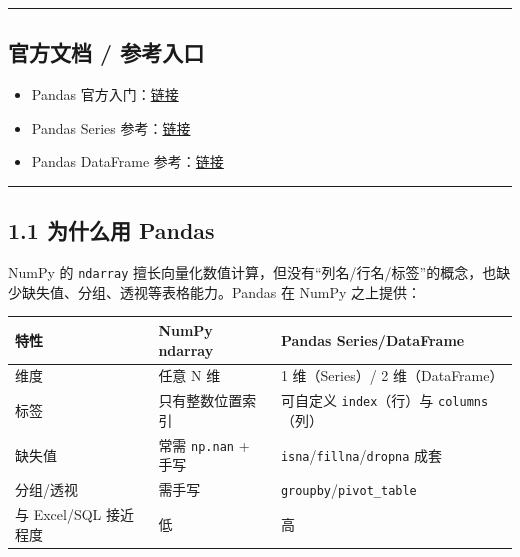 \begin{center}\rule{0.5\linewidth}{0.5pt}\end{center}

\subsection{官方文档 /
参考入口}\label{ux5b98ux65b9ux6587ux6863-ux53c2ux8003ux5165ux53e3-5}

\begin{itemize}
\tightlist
\item
  Pandas
  官方入门：\href{https://pandas.pydata.org/docs/user_guide/10min.html}{链接}
\item
  Pandas Series
  参考：\href{https://pandas.pydata.org/docs/reference/api/pandas.Series.html}{链接}
\item
  Pandas DataFrame
  参考：\href{https://pandas.pydata.org/docs/reference/api/pandas.DataFrame.html}{链接}
\end{itemize}

\begin{center}\rule{0.5\linewidth}{0.5pt}\end{center}

\subsection{1.1 为什么用 Pandas}\label{ux4e3aux4ec0ux4e48ux7528-pandas}

NumPy 的 \texttt{ndarray}
擅长向量化数值计算，但没有``列名/行名/标签''的概念，也缺少缺失值、分组、透视等表格能力。Pandas
在 NumPy 之上提供：

{\def\LTcaptype{none} %
\begin{longtable}[]{@{}lll@{}}
\toprule\noalign{}
特性 & NumPy ndarray & Pandas Series/DataFrame \\
\midrule\noalign{}
\endhead
\bottomrule\noalign{}
\endlastfoot
维度 & 任意 N 维 & 1 维（Series）/ 2 维（DataFrame） \\
标签 & 只有整数位置索引 & 可自定义 \texttt{index}（行）与
\texttt{columns}（列） \\
缺失值 & 常需 \texttt{np.nan} + 手写 &
\texttt{isna}/\texttt{fillna}/\texttt{dropna} 成套 \\
分组/透视 & 需手写 & \texttt{groupby}/\texttt{pivot\_table} \\
与 Excel/SQL 接近程度 & 低 & 高 \\
\end{longtable}
}

